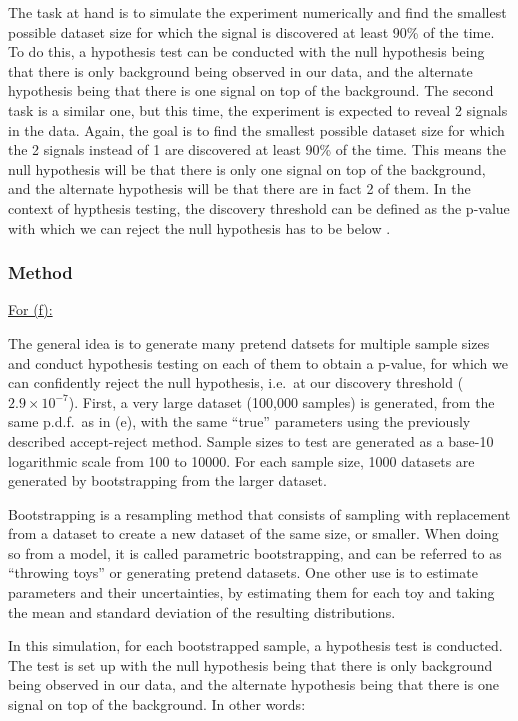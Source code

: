 \documentclass[12pt]{report} %
\begin{document}
The task at hand is to simulate the experiment numerically and find the smallest possible dataset size for which the signal is discovered at least 90\% of the time. To do this, a hypothesis test can be conducted with the null hypothesis being that there is only background being observed in our data, and the alternate hypothesis being that there is one signal on top of the background. The second task is a similar one, but this time, the experiment is expected to reveal 2 signals in the data. Again, the goal is to find the smallest possible dataset size for which the 2 signals instead of 1 are discovered at least 90\% of the time. This means the null hypothesis will be that there is only one signal on top of the background, and the alternate hypothesis will be that there are in fact 2 of them. In the context of hypthesis testing, the discovery threshold can be defined as the p-value with which we can reject the null hypothesis has to be below .

\subsubsection*{Method}

\underline{For (f):}  

\vspace*{1\baselineskip}
The general idea is to generate many pretend datsets for multiple sample sizes and conduct hypothesis testing on each of them to obtain a p-value, for which we can confidently reject the null hypothesis, i.e.\ at our discovery threshold ($2.9 \times 10^{-7}$).  
First, a very large dataset (100,000 samples) is generated, from the same p.d.f.\ as in (e), with the same ``true'' parameters using the previously described accept-reject method. Sample sizes to test are generated as a base-10 logarithmic scale from 100 to 10000. For each sample size, 1000 datasets are generated by bootstrapping from the larger dataset.


Bootstrapping is a resampling method that consists of sampling with replacement from a dataset to create a new dataset of the same size, or smaller. When doing so from a model, it is called parametric bootstrapping, and can be referred to as ``throwing toys'' or generating pretend datasets. One other use is to estimate parameters and their uncertainties, by estimating them for each toy and taking the mean and standard deviation of the resulting distributions.  

In this simulation, for each bootstrapped sample, a hypothesis test is conducted. The test is set up with the null hypothesis being that there is only background being observed in our data, and the alternate hypothesis being that there is one signal on top of the background. In other words:  
\end{document}
